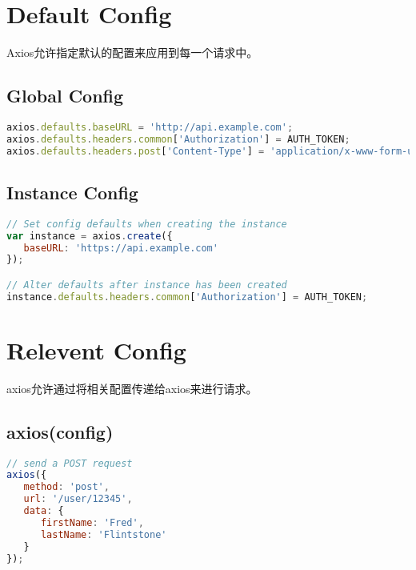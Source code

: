 \section{Default Config}

Axios允许指定默认的配置来应用到每一个请求中。

\subsection{Global Config}



\begin{lstlisting}[language=JavaScript]
axios.defaults.baseURL = 'http://api.example.com';
axios.defaults.headers.common['Authorization'] = AUTH_TOKEN;
axios.defaults.headers.post['Content-Type'] = 'application/x-www-form-urlencoded';
\end{lstlisting}

\subsection{Instance Config}





\begin{lstlisting}[language=JavaScript]
// Set config defaults when creating the instance
var instance = axios.create({
   baseURL: 'https://api.example.com'
});

// Alter defaults after instance has been created
instance.defaults.headers.common['Authorization'] = AUTH_TOKEN;
\end{lstlisting}




\section{Relevent Config}


axios允许通过将相关配置传递给axios来进行请求。

\subsection{axios(config)}


\begin{lstlisting}[language=JavaScript]
// send a POST request
axios({
   method: 'post',
   url: '/user/12345',
   data: {
      firstName: 'Fred',
      lastName: 'Flintstone'
   }
});
\end{lstlisting}

